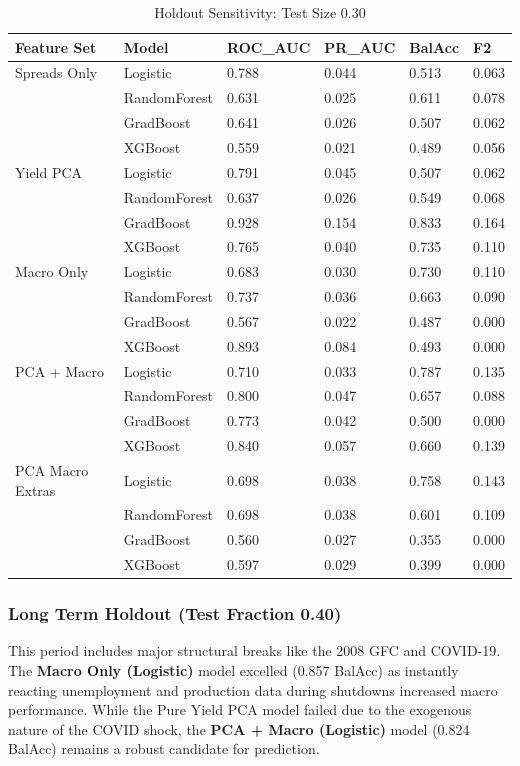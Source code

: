 \begin{table}[h!]
\centering
\caption{Holdout Sensitivity: Test Size 0.30}
\small
\begin{tabular}{@{}llllll@{}}
\toprule
\textbf{Feature Set} & \textbf{Model} & \textbf{ROC\_AUC} & \textbf{PR\_AUC} & \textbf{BalAcc} & \textbf{F2} \\ \midrule
Spreads Only & Logistic & 0.788 & 0.044 & 0.513 & 0.063 \\
& RandomForest & 0.631 & 0.025 & 0.611 & 0.078 \\
& GradBoost & 0.641 & 0.026 & 0.507 & 0.062 \\
& XGBoost & 0.559 & 0.021 & 0.489 & 0.056 \\ \midrule
Yield PCA & Logistic & 0.791 & 0.045 & 0.507 & 0.062 \\
& RandomForest & 0.637 & 0.026 & 0.549 & 0.068 \\
& GradBoost & 0.928 & 0.154 & 0.833 & 0.164 \\
& XGBoost & 0.765 & 0.040 & 0.735 & 0.110 \\ \midrule
Macro Only & Logistic & 0.683 & 0.030 & 0.730 & 0.110 \\
& RandomForest & 0.737 & 0.036 & 0.663 & 0.090 \\
& GradBoost & 0.567 & 0.022 & 0.487 & 0.000 \\
& XGBoost & 0.893 & 0.084 & 0.493 & 0.000 \\ \midrule
PCA + Macro & Logistic & 0.710 & 0.033 & 0.787 & 0.135 \\
& RandomForest & 0.800 & 0.047 & 0.657 & 0.088 \\
& GradBoost & 0.773 & 0.042 & 0.500 & 0.000 \\
& XGBoost & 0.840 & 0.057 & 0.660 & 0.139 \\ \midrule
PCA Macro Extras & Logistic & 0.698 & 0.038 & 0.758 & 0.143 \\
& RandomForest & 0.698 & 0.038 & 0.601 & 0.109 \\
& GradBoost & 0.560 & 0.027 & 0.355 & 0.000 \\
& XGBoost & 0.597 & 0.029 & 0.399 & 0.000 \\ \bottomrule
\end{tabular}
\end{table}

\subsubsection{Long Term Holdout (Test Fraction 0.40)}
This period includes major structural breaks like the 2008 GFC and COVID-19. The \textbf{Macro Only (Logistic)} model excelled (0.857 BalAcc) as instantly reacting unemployment and production data during shutdowns increased macro performance. While the Pure Yield PCA model failed due to the exogenous nature of the COVID shock, the \textbf{PCA + Macro (Logistic)} model (0.824 BalAcc) remains a robust candidate for prediction.

